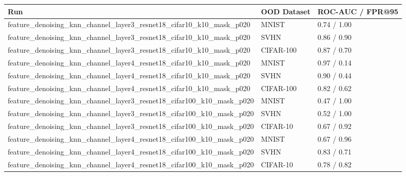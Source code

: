 \begin{tabular}{lll}
\toprule
Run & OOD Dataset & ROC-AUC / FPR@95 \\
\midrule
feature\_denoising\_knn\_channel\_layer3\_resnet18\_cifar10\_k10\_mask\_p020 & MNIST & 0.74 / 1.00 \\
feature\_denoising\_knn\_channel\_layer3\_resnet18\_cifar10\_k10\_mask\_p020 & SVHN & 0.86 / 0.90 \\
feature\_denoising\_knn\_channel\_layer3\_resnet18\_cifar10\_k10\_mask\_p020 & CIFAR-100 & 0.87 / 0.70 \\
feature\_denoising\_knn\_channel\_layer4\_resnet18\_cifar10\_k10\_mask\_p020 & MNIST & 0.97 / 0.14 \\
feature\_denoising\_knn\_channel\_layer4\_resnet18\_cifar10\_k10\_mask\_p020 & SVHN & 0.90 / 0.44 \\
feature\_denoising\_knn\_channel\_layer4\_resnet18\_cifar10\_k10\_mask\_p020 & CIFAR-100 & 0.82 / 0.62 \\
feature\_denoising\_knn\_channel\_layer3\_resnet18\_cifar100\_k10\_mask\_p020 & MNIST & 0.47 / 1.00 \\
feature\_denoising\_knn\_channel\_layer3\_resnet18\_cifar100\_k10\_mask\_p020 & SVHN & 0.52 / 1.00 \\
feature\_denoising\_knn\_channel\_layer3\_resnet18\_cifar100\_k10\_mask\_p020 & CIFAR-10 & 0.67 / 0.92 \\
feature\_denoising\_knn\_channel\_layer4\_resnet18\_cifar100\_k10\_mask\_p020 & MNIST & 0.67 / 0.96 \\
feature\_denoising\_knn\_channel\_layer4\_resnet18\_cifar100\_k10\_mask\_p020 & SVHN & 0.83 / 0.71 \\
feature\_denoising\_knn\_channel\_layer4\_resnet18\_cifar100\_k10\_mask\_p020 & CIFAR-10 & 0.78 / 0.82 \\
\bottomrule
\end{tabular}
